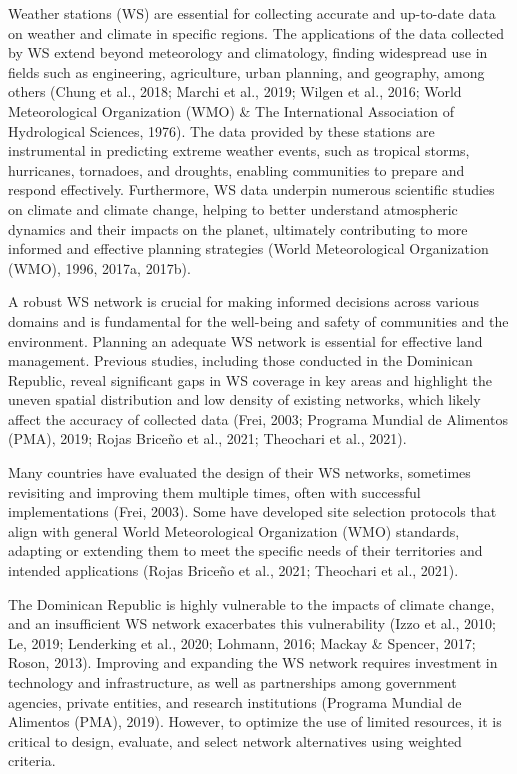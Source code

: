 \documentclass[spanish]{article}
\begin{document}
Weather stations (WS) are essential for collecting accurate and
up-to-date data on weather and climate in specific regions. The
applications of the data collected by WS extend beyond meteorology and
climatology, finding widespread use in fields such as engineering,
agriculture, urban planning, and geography, among others (Chung et al.,
2018; Marchi et al., 2019; Wilgen et al., 2016; World Meteorological
Organization (WMO) \& The International Association of Hydrological
Sciences, 1976). The data provided by these stations are instrumental in
predicting extreme weather events, such as tropical storms, hurricanes,
tornadoes, and droughts, enabling communities to prepare and respond
effectively. Furthermore, WS data underpin numerous scientific studies
on climate and climate change, helping to better understand atmospheric
dynamics and their impacts on the planet, ultimately contributing to
more informed and effective planning strategies (World Meteorological
Organization (WMO), 1996, 2017a, 2017b).

A robust WS network is crucial for making informed decisions across
various domains and is fundamental for the well-being and safety of
communities and the environment. Planning an adequate WS network is
essential for effective land management. Previous studies, including
those conducted in the Dominican Republic, reveal significant gaps in WS
coverage in key areas and highlight the uneven spatial distribution and
low density of existing networks, which likely affect the accuracy of
collected data (Frei, 2003; Programa Mundial de Alimentos (PMA), 2019;
Rojas Briceño et al., 2021; Theochari et al., 2021).

Many countries have evaluated the design of their WS networks, sometimes
revisiting and improving them multiple times, often with successful
implementations (Frei, 2003). Some have developed site selection
protocols that align with general World Meteorological Organization
(WMO) standards, adapting or extending them to meet the specific needs
of their territories and intended applications (Rojas Briceño et al.,
2021; Theochari et al., 2021).

The Dominican Republic is highly vulnerable to the impacts of climate
change, and an insufficient WS network exacerbates this vulnerability
(Izzo et al., 2010; Le, 2019; Lenderking et al., 2020; Lohmann, 2016;
Mackay \& Spencer, 2017; Roson, 2013). Improving and expanding the WS
network requires investment in technology and infrastructure, as well as
partnerships among government agencies, private entities, and research
institutions (Programa Mundial de Alimentos (PMA), 2019). However, to
optimize the use of limited resources, it is critical to design,
evaluate, and select network alternatives using weighted criteria.
\end{document}
